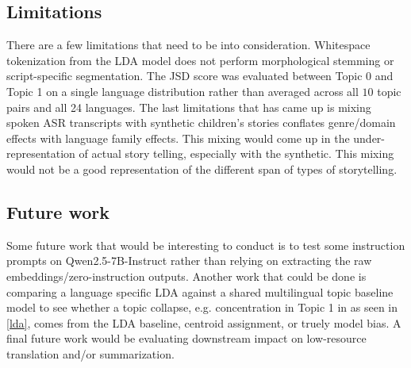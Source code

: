 \documentclass[11pt]{article} %
\begin{document}
    \subsection{Limitations}
    There are a few limitations that need to be into consideration. Whitespace
    tokenization from the LDA model does not perform morphological stemming or
    script-specific segmentation. The JSD score was evaluated between Topic 0 and
    Topic 1 on a single language distribution rather than averaged across all $10$
    topic pairs and all 24 languages. The last limitations that has came up is
    mixing spoken ASR transcripts with synthetic children's stories conflates
    genre/domain effects with language family effects. This mixing would come up in
    the under-representation of actual story telling, especially with the
    synthetic. This mixing would not be a good representation of the different span
    of types of storytelling.

    \subsection{Future work}
    Some future work that would be interesting to conduct is to test some instruction
    prompts on Qwen2.5-7B-Instruct \citep{qwen2.5, qwen2} rather than relying on extracting
    the raw embeddings/zero-instruction outputs. Another work that could be done
    is comparing a language specific LDA against a shared multilingual topic
    baseline model to see whether a topic collapse, e.g. concentration in Topic
    1 in as seen in \autoref{lda}, comes from the LDA baseline, centroid
    assignment, or truely model bias. A final future work would be evaluating
    downstream impact on low-resource translation and/or summarization.

    

    \appendix
\end{document}
